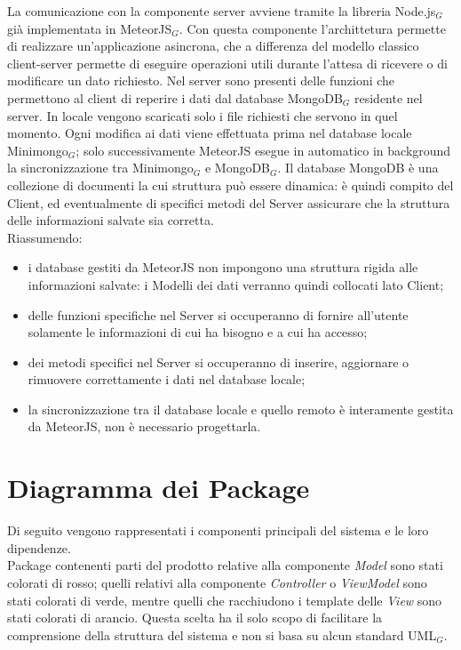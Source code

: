 La comunicazione con la componente server avviene tramite la libreria Node.js$_G$ già implementata in MeteorJS$_G$. Con questa componente l'archittetura permette di realizzare un'applicazione asincrona, che a differenza del modello classico client-server permette di eseguire operazioni utili durante l'attesa di ricevere o di modificare un dato richiesto.
Nel server sono presenti delle funzioni che permettono al client di reperire i dati dal database MongoDB$_G$ residente nel server. In locale vengono scaricati solo i file richiesti che servono in quel momento. Ogni modifica ai dati viene effettuata prima nel database locale Minimongo$_G$; solo successivamente MeteorJS esegue in automatico in background la sincronizzazione tra Minimongo$_G$ e MongoDB$_G$. Il database MongoDB è una collezione di documenti la cui struttura può essere dinamica: è quindi compito del Client, ed eventualmente di specifici metodi del Server assicurare che la struttura delle informazioni salvate sia corretta. \\
Riassumendo:
\begin{itemize}
\item i database gestiti da MeteorJS non impongono una struttura rigida alle informazioni salvate: i Modelli dei dati verranno quindi collocati lato Client;
\item delle funzioni specifiche nel Server si occuperanno di fornire all'utente solamente le informazioni di cui ha bisogno e a cui ha accesso;
\item dei metodi specifici nel Server si occuperanno di inserire, aggiornare o rimuovere correttamente i dati nel database locale;
\item la sincronizzazione tra il database locale e quello remoto è interamente gestita da MeteorJS, non è necessario progettarla.
\end{itemize}
\clearpage
\newpage
\section{Diagramma dei Package}
Di seguito vengono rappresentati i componenti principali del sistema e le loro dipendenze. \\
Package contenenti parti del prodotto relative alla componente \textit{Model} sono stati colorati di rosso; quelli relativi alla componente \textit{Controller} o \textit{ViewModel} sono stati colorati di verde, mentre quelli che racchiudono i template delle \textit{View} sono stati colorati di arancio. Questa scelta ha il solo scopo di facilitare la comprensione della struttura del sistema e non si basa su alcun standard UML$_G$.

